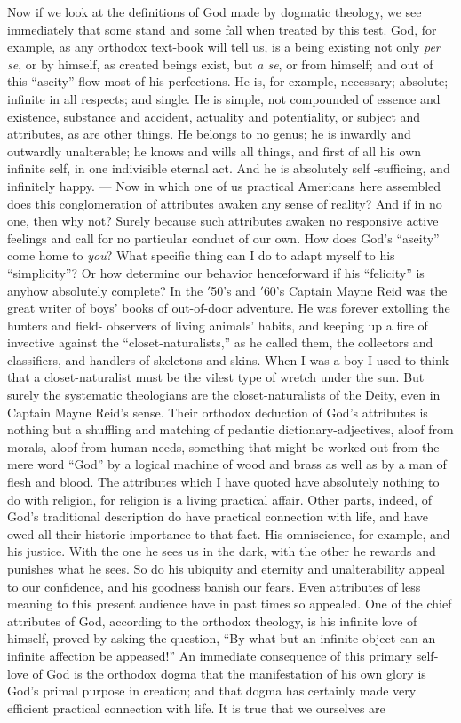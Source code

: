 \documentclass[]{article}
\begin{document}
Now if we look at the definitions of God made by dogmatic theology, we see immediately that some stand and some fall when treated by this test. God, for example, as any orthodox text-book will tell us, is a being existing not only \emph{per se}, or by himself, as created beings exist, but \emph{a se}, or from himself; and out of this ``aseity'' flow most of his perfections. He is, for example, necessary; absolute; infinite in all respects; and single. He is simple, not compounded of essence and existence, substance and accident, actuality and potentiality, or subject and attributes, as are other things. He belongs to no genus; he is inwardly and outwardly unalterable; he knows and wills all things, and first of all his own infinite self, in one indivisible eternal act. And he is absolutely self -sufficing, and infinitely happy. --- Now in which one of us practical Americans here assembled does this conglomeration of attributes awaken any sense of reality? And if in no one, then why not? Surely because such attributes awaken no responsive active feelings and call for no particular conduct of our own. How does God's ``aseity'' come home to \emph{you}? What specific thing can I do to adapt myself to his ``simplicity''? Or how determine our behavior henceforward if his ``felicity'' is anyhow absolutely complete? In the $'$50's and $'$60's Captain Mayne Reid was the great writer of boys' books of out-of-door adventure. He was forever extolling the hunters and field- observers of living animals' habits, and keeping up a fire of invective against the ``closet-naturalists,'' as he called them, the collectors and classifiers, and handlers of skeletons and skins. When I was a boy I used to think that a closet-naturalist must be the vilest type of wretch under the sun. But surely the systematic theologians are the closet-naturalists of the Deity, even in Captain Mayne Reid's sense. Their orthodox deduction of God's attributes is nothing but a shuffling and matching of pedantic dictionary-adjectives, aloof from morals, aloof from human needs, something that might be worked out from the mere word ``God'' by a logical machine of wood and brass as well as by a man of flesh and blood. The attributes which I have quoted have absolutely nothing to do with religion, for religion is a living practical affair. Other parts, indeed, of God's traditional description do have practical connection with life, and have owed all their historic importance to that fact. His omniscience, for example, and his justice. With the one he sees us in the dark, with the other he rewards and punishes what he sees. So do his ubiquity and eternity and unalterability appeal to our confidence, and his goodness banish our fears. Even attributes of less meaning to this present audience have in past times so appealed. One of the chief attributes of God, according to the orthodox theology, is his infinite love of himself, proved by asking the question, ``By what but an infinite object can an infinite affection be appeased!'' An immediate consequence of this primary self-love of God is the orthodox dogma that the manifestation of his own glory is God's primal purpose in creation; and that dogma has certainly made very efficient practical connection with life. It is true that we ourselves are 
\end{document}
